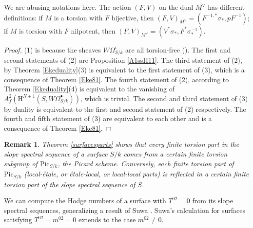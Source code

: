 \documentclass[a4paper,12pt,twoside]{report}
\newtheorem{remark}[theorem]{Remark}
\newcommand{\Pic}{\mathrm{Pic}}
\newcommand{\HH}{\mathrm{H}}
\begin{document}
We are abusing notations here. The action $(F,V)$ on the dual $M^\vee$ has different definitions: if $M$ is a torsion with $F$ bijective, then $(F,V)_{M^\vee}=(F^{-1,*}\sigma_{*},pF^{-1})$; 
if $M$ is torsion with $F$ nilpotent, then $(F,V)_{M^\vee}=(V^{*}\sigma_{*},F^*\sigma^{-1}_*)$. 

\begin{proof}
     (1) is because the sheaves $W\Omega^i_{S/k}$ are all torsion-free (\cite{Il1}). 
The first and second statements of (2) are Proposition \ref{A1ssH11}. 
The third statement of (2), by Theorem \ref{Ekeduality}(3) is equivalent to the first statement of (3), 
which is a consequence of Theorem \ref{Eke81}. 
The fourth statement of (2), according to Theorem \ref{Ekeduality}(4) is equivalent to the vanishing of 
$A_{f}^2(\HH^{N+1}(S,W\Omega^\bullet_{S/k}))$, which is trivial. 
The second and third statement of (3) by duality is equivalent to the first and second statement of (2) respectively. 
The fourth and fifth statement of (3) are equivalent to each other and is a consequence of Theorem \ref{Eke81}.
\end{proof}

\begin{remark}{\rm
    Theorem \ref{surfacesparts} shows that every finite torsion part in the slope spectral sequence 
    of a surface $S/k$ comes from a certain finite torsion subgroup of $\Pic_{S/k}$, the Picard scheme. 
    Conversely, each finite torsion part of $\Pic_{S/k}$ (local-\'etale, or \'etale-local, or local-local parts) 
    is reflected in a certain finite torsion part of the slope spectral sequence of $S$. }
\end{remark}

We can compute the Hodge numbers of a surface with $T^{02}=0$ from its slope spectral sequences, generalizing a result of Suwa \cite{Su}. 
Suwa's calculation for surfaces satisfying $T^{02}=m^{02}=0$ extends to the case $m^{02}\neq 0$. 
\end{document}
